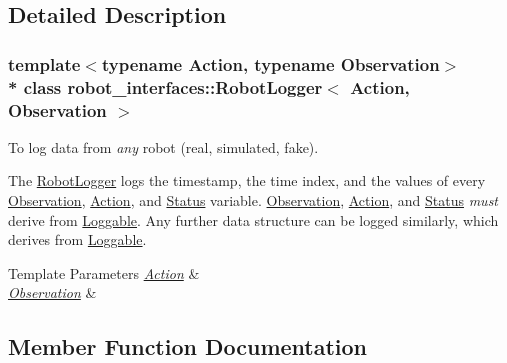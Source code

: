 \subsection{Detailed Description}
\subsubsection*{template$<$typename Action, typename Observation$>$\\*
class robot\+\_\+interfaces\+::\+Robot\+Logger$<$ Action, Observation $>$}

To log data from {\itshape any} robot (real, simulated, fake). 

The \hyperlink{classrobot__interfaces_1_1RobotLogger}{Robot\+Logger} logs the timestamp, the time index, and the values of every \hyperlink{classObservation}{Observation}, \hyperlink{classAction}{Action}, and \hyperlink{structrobot__interfaces_1_1Status}{Status} variable. \hyperlink{classObservation}{Observation}, \hyperlink{classAction}{Action}, and \hyperlink{structrobot__interfaces_1_1Status}{Status} {\itshape must} derive from \hyperlink{classrobot__interfaces_1_1Loggable}{Loggable}. Any further data structure can be logged similarly, which derives from \hyperlink{classrobot__interfaces_1_1Loggable}{Loggable}.


\begin{DoxyTemplParams}{Template Parameters}
{\em \hyperlink{classAction}{Action}} & \\
\hline
{\em \hyperlink{classObservation}{Observation}} & \\
\hline
\end{DoxyTemplParams}


\subsection{Member Function Documentation}
